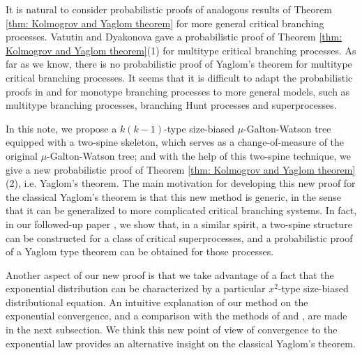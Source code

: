 \documentclass[12pt,a4paper]{amsart}
\numberwithin{equation}{section}
\begin{document}
	It is natural to consider probabilistic proofs of analogous results of Theorem \ref{thm: Kolmogrov and Yaglom theorem} for more general critical branching processes. 
	Vatutin and  Dyakonova \cite{VD} gave a probabilistic proof of Theorem \ref{thm: Kolmogrov and Yaglom theorem}(1) for multitype critical branching processes.
	As far as we know, there is no probabilistic proof of Yaglom's theorem for multitype critical branching processes. 
	It seems that it is difficult to adapt the probabilistic proofs in \cite{geiger2000new} and \cite{lyons1995conceptual} for monotype branching processes to more general models, such as multitype branching processes, branching Hunt processes and superprocesses.

	In this note, we propose a $k(k-1)$-type size-biased $\mu$-Galton-Watson tree equipped with a two-spine skeleton, which serves as a change-of-measure of the original $\mu$-Galton-Watson tree;
	and with the help of this two-spine technique, we give a new probabilistic proof of Theorem \ref{thm: Kolmogrov and Yaglom theorem}(2), i.e. Yaglom's theorem.
	The main motivation for developing this new proof for the classical Yaglom's theorem is that this new method is generic, in the sense that it can be generalized to more complicated critical branching systems. 
	In fact, in our followed-up paper \cite{RenSongSun2017Spine}, we show that, in a similar spirit, a two-spine structure can be constructed for a class of critical superprocesses, and a probabilistic proof of a Yaglom type theorem can be obtained for those processes. 



	Another aspect of our new proof is that we take advantage of a fact that the exponential distribution can be characterized by a particular $x^2$-type size-biased distributional equation.
	An intuitive explanation of our method on the exponential convergence, and a comparison with the methods of \cite{geiger2000new} and \cite{lyons1995conceptual}, are
	made in the next subsection.  
	We think this new point of view of convergence to the exponential law provides an alternative insight on the classical Yaglom's theorem.
\end{document}
